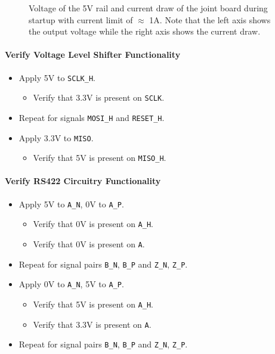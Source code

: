 \begin{figure}[h]
	\centering
	
	\caption[Voltages and current of 5V converter without current limit.]{Voltage of the 5V rail and current draw of the joint board during startup with current limit of $\approx$ 1A. Note that the left axis shows the output voltage while the right axis shows the current draw.}
	\label{fig:joint_no_curr_limit}
\end{figure}

\paragraph{Verify Voltage Level Shifter Functionality} %
\label{par:verify_voltage_level_shifter_functionality}
\begin{itemize}
	\item Apply 5V to \texttt{SCLK\_H}.
	\begin{itemize}
		\item[\cmark]  Verify that 3.3V is present on \texttt{SCLK}.
	\end{itemize}
	\item Repeat for signals \texttt{MOSI\_H} and \texttt{RESET\_H}.
	\item Apply 3.3V to \texttt{MISO}.
	\begin{itemize}
		\item[\cmark]  Verify that 5V is present on \texttt{MISO\_H}.
	\end{itemize}
\end{itemize}

\paragraph{Verify RS422 Circuitry Functionality} %
\label{par:verify_rs_422_circuitry_functionality}
\begin{itemize}
	\item Apply 5V to \texttt{A\_N}, 0V to \texttt{A\_P}.
	\begin{itemize}
		\item[\cmark] Verify that 0V is present on \texttt{A\_H}.
		\item[\cmark] Verify that 0V is present on \texttt{A}.
	\end{itemize}
	\item Repeat for signal pairs \texttt{B\_N}, \texttt{B\_P} and \texttt{Z\_N}, \texttt{Z\_P}.
	\item Apply 0V to \texttt{A\_N}, 5V to \texttt{A\_P}.
	\begin{itemize}
		\item[\cmark] Verify that 5V is present on \texttt{A\_H}.
		\item[\cmark] Verify that 3.3V is present on \texttt{A}.
	\end{itemize}
	\item Repeat for signal pairs \texttt{B\_N}, \texttt{B\_P} and \texttt{Z\_N}, \texttt{Z\_P}.
\end{itemize}
